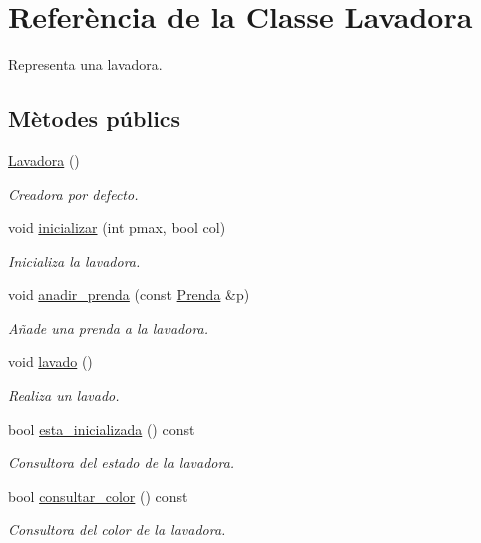 \hypertarget{class_lavadora}{\section{Referència de la Classe Lavadora}
\label{class_lavadora}
}


Representa una lavadora.  


\subsection*{Mètodes públics}
\begin{DoxyCompactItemize}
\item 
\hyperlink{class_lavadora_a2366b1cd0ba86f8ef8ba8504067dc114}{Lavadora} ()
\begin{DoxyCompactList}\small\item\em Creadora por defecto. \end{DoxyCompactList}\item 
void \hyperlink{class_lavadora_a733af02910dca3f75390be4ca6ac84f6}{inicializar} (int pmax, bool col)
\begin{DoxyCompactList}\small\item\em Inicializa la lavadora. \end{DoxyCompactList}\item 
void \hyperlink{class_lavadora_a7e465e1f11ba5ba3cffcee1ce9507e79}{anadir\+\_\+prenda} (const \hyperlink{class_prenda}{Prenda} \&p)
\begin{DoxyCompactList}\small\item\em Añade una prenda a la lavadora. \end{DoxyCompactList}\item 
void \hyperlink{class_lavadora_a82bd403e688482030fcb95f0c3fd62d1}{lavado} ()
\begin{DoxyCompactList}\small\item\em Realiza un lavado. \end{DoxyCompactList}\item 
bool \hyperlink{class_lavadora_a0788f5869b65672123a0f53f278b6165}{esta\+\_\+inicializada} () const 
\begin{DoxyCompactList}\small\item\em Consultora del estado de la lavadora. \end{DoxyCompactList}\item 
bool \hyperlink{class_lavadora_a0f1a4951efc12b14052463e1a317b5a7}{consultar\+\_\+color} () const 
\begin{DoxyCompactList}\small\item\em Consultora del color de la lavadora. \end{DoxyCompactList}\item 

\end{DoxyCompactItemize}
